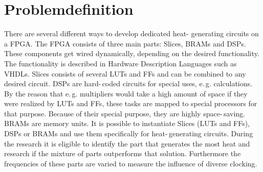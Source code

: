 \chapter{Problemdefinition}
\label{ch:problem}

There are several different ways to develop dedicated heat- generating circuits on a \ac{FPGA}. The \ac{FPGA} consists of three main parts: Slices, \acp{BRAM} and \acp{DSP}. These components get wired dynamically, depending on the desired functionality. The functionality is described in Hardware Description Languages such as \acp{VHDL}. Slices consists of several \acp{LUT} and \acp{FF} and can be combined to any desired circuit. \acp{DSP} are hard-\,coded circuits for special uses, e.\,g. calculations. By the reason that e.\,g. multipliers would take a high amount of space if they were realized by \acp{LUT} and \acp{FF}, these tasks are mapped to special processors for that purpose. Because of their special purpose, they are highly space-\,saving. \acp{BRAM} are memory units. It is possible to instantiate Slices (\acp{LUT} and \acp{FF}), \acp{DSP} or \acp{BRAM} and use them specifically for heat-\,generating circuits. During the research it is eligible to identify the part that generates the most heat and research if the mixture of parts outperforms that solution. Furthermore the frequencies of these parts are varied to measure the influence of diverse clocking.